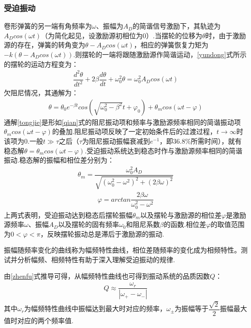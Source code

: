 \documentclass[12pt,a4paper,oneside,left=3.18,right=3.18,top=2.54,bottom=2.54]{ctexart}
\begin{document}
		\subsubsection{受迫振动}
			卷形弹簧的另一端有角频率为$\omega$、振幅为$A_D$的简谐信号激励下，其轨迹为$A_Dcos(\omega t)$（为简化起见，设激励源初相位为$0$）.当摆轮的位移为$\theta$时，由于激励源的存在，弹簧的转角变为$\theta-A_Dcos(\omega t)$，相应的弹簧恢复力矩为$-k(\theta-A_Dcos(\omega t))$.则摆轮的一端将跟随激励源作简谐运动，\eqref{yundong}式所示的摆轮的运动方程变为：
			\begin{align}
			\dfrac{d^2\theta}{dt^2}+2\beta\dfrac{d\theta}{dt}+\omega_0^2\theta=\omega_0^2A_Dcos(\omega t)
			\end{align}
			欠阻尼情况，其通解为：
			\begin{equation}
			\begin{aligned}
			\theta=\theta_0e^{-\beta t}cos\left(\sqrt{\omega_0^2-\beta^2}t+\varphi_0\right)+\theta_mcos(\omega t-\varphi)
			\end{aligned}
			\label{tongjie}
			\end{equation}
			通解\eqref{tongjie}是形如\eqref{qian}式的阻尼振动项和频率与激励源频率相同的简谐振动项$\theta_mcos(\omega t-\varphi)$的叠加.阻尼振动项反映了一定初始条件后的过渡过程，$t\to\infty$时该项为$0$.一般$t\gg\tau$之后（$\tau$为阻尼振动振幅衰减到$e^{-1}$，即$36.8\%$所需时间），就有稳态解$\theta=\theta_mcos(\omega t-\varphi)$.受迫振动系统达到稳态时作与激励源频率相同的简谐振动.稳态解的振幅和相位差分别为：
			\begin{equation}
			\begin{aligned}
			\theta_m=\dfrac{\omega_0^2A_D}{\sqrt{(\omega_0^2-\omega^2)^2+(2\beta\omega)^2}}
			\end{aligned}
			\label{zhenfu}
			\end{equation}
			\begin{align}
			\varphi=arctan\dfrac{2\beta\omega}{\omega_0^2-\omega^2}
			\end{align}
			上两式表明，受迫振动达到稳态后摆轮振幅$\theta_m$以及摆轮与激励源的相位差$\varphi$是激励源频率$\omega$、振幅$A_D$以及摆轮的固有频率$\omega_0$和阻尼系数$\beta$的函数.相位差$\varphi$的取值范围为$0<\varphi<\pi$，反映摆轮振动总是滞后于激励源的振动.\par
			振幅随频率变化的曲线称为幅频特性曲线，相位差随频率的变化成为相频特性。测试并分析幅频、相频特性有助于深入理解受迫振动的规律.\par
			由\eqref{zhenfu}式推导可得，从幅频特性曲线也可得到振动系统的品质因数$Q$：
			\begin{align}
			Q\approx\dfrac{\omega_r}{|\omega_+-\omega_-|}
			\end{align}
			其中$\omega_r$为幅频特性曲线中振幅达到最大时对应的频率，$\omega_\pm$为振幅等于$\dfrac{\sqrt2}{2}$振幅最大值时对应的两个频率值.
\end{document}
